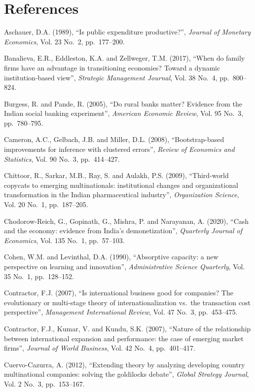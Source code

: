 \documentclass[
  12pt]{article}
\begin{document}
\hypertarget{references}{%
\section{References}\label{references}}

Aschauer, D.A. (1989), ``Is public expenditure productive?'',
\emph{Journal of Monetary Economics}, Vol. 23 No.~2, pp.~177--200.

Banalieva, E.R., Eddleston, K.A. and Zellweger, T.M. (2017), ``When do
family firms have an advantage in transitioning economies? Toward a
dynamic institution-based view'', \emph{Strategic Management Journal},
Vol. 38 No.~4, pp.~800--824.

Burgess, R. and Pande, R. (2005), ``Do rural banks matter? Evidence from
the Indian social banking experiment'', \emph{American Economic Review},
Vol. 95 No.~3, pp.~780--795.

Cameron, A.C., Gelbach, J.B. and Miller, D.L. (2008), ``Bootstrap-based
improvements for inference with clustered errors'', \emph{Review of
Economics and Statistics}, Vol. 90 No.~3, pp.~414--427.

Chittoor, R., Sarkar, M.B., Ray, S. and Aulakh, P.S. (2009),
``Third-world copycats to emerging multinationals: institutional changes
and organizational transformation in the Indian pharmaceutical
industry'', \emph{Organization Science}, Vol. 20 No.~1, pp.~187--205.

Chodorow-Reich, G., Gopinath, G., Mishra, P. and Narayanan, A. (2020),
``Cash and the economy: evidence from India's demonetization'',
\emph{Quarterly Journal of Economics}, Vol. 135 No.~1, pp.~57--103.

Cohen, W.M. and Levinthal, D.A. (1990), ``Absorptive capacity: a new
perspective on learning and innovation'', \emph{Administrative Science
Quarterly}, Vol. 35 No.~1, pp.~128--152.

Contractor, F.J. (2007), ``Is international business good for companies?
The evolutionary or multi-stage theory of internationalization vs.~the
transaction cost perspective'', \emph{Management International Review},
Vol. 47 No.~3, pp.~453--475.

Contractor, F.J., Kumar, V. and Kundu, S.K. (2007), ``Nature of the
relationship between international expansion and performance: the case
of emerging market firms'', \emph{Journal of World Business}, Vol. 42
No.~4, pp.~401--417.

Cuervo-Cazurra, A. (2012), ``Extending theory by analyzing developing
country multinational companies: solving the goldilocks debate'',
\emph{Global Strategy Journal}, Vol. 2 No.~3, pp.~153--167.
\end{document}
